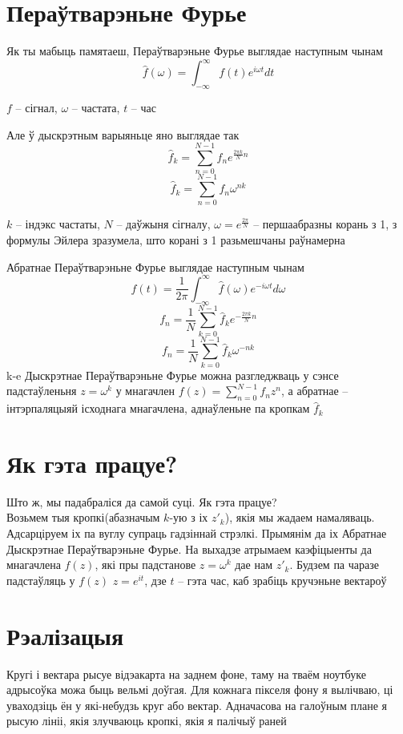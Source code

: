 \documentclass{article}
\newcommand{\rl}{\hspace*{5mm}}
\begin{document}
\section{Пераўтварэньне Фурье}
\rl Як ты мабыць памятаеш, Пераўтварэньне Фурье выглядае наступным чынам
\[ \hat{f}(\omega) = \int_{-\infty}^{\infty}{f(t)e^{i\omega t}dt} \]
\begin{center}
    \scriptsize $f$ \--- сігнал, $\omega$ \--- частата, $t$ \--- час
\end{center}
\rl Але ў дыскрэтным варыяньце яно выглядае так
\[ \hat{f}_k = \sum_{n = 0}^{N - 1}{f_n e^{\frac{2\pi k}{N}n}} \]
\[ \hat{f}_k = \sum_{n = 0}^{N - 1}{f_n \omega^{nk}} \]
\begin{center}
    \scriptsize $k$ \--- індэкс частаты, $N$ \--- даўжыня сігналу, $\omega = e^{\frac{2\pi}{N}}$ \--- першаабразны корань з 1, з формулы Эйлера зразумела,
    што корані з 1 разьмешчаны раўнамерна
\end{center}
\rl Абратнае Пераўтварэньне Фурье выглядае наступным чынам
\[ f(t) = \frac{1}{2\pi} \int_{-\infty}^{\infty}{\hat{f}(\omega)e^{-i\omega t} d\omega} \]
\[ f_n = \frac{1}{N} \sum_{k = 0}^{N - 1}{\hat{f}_k e^{-\frac{2\pi k}{N} n}} \]
\[ f_n = \frac{1}{N} \sum_{k = 0}^{N - 1}{\hat{f}_k \omega^{-nk}}\]
\rl k-e Дыскрэтнае Пераўтварэньне Фурье можна разгледжваць у сэнсе падстаўленьня $z = \omega^k$ у мнагачлен $f(z) = \sum_{n = 0}^{N - 1}{f_n z^n}$, а абратнае \--- інтэрпаляцыяй ісходнага мнагачлена,
аднаўленьне па кропкам $\hat{f}_k$
\section{Як гэта працуе?}
\rl Што ж, мы падабраліся да самой суці. Як гэта працуе? \\
\rl Возьмем тыя кропкі(абазначым $k$-ую з іх $z'_k$), якія мы жадаем намаляваць. Адсарціруем іх па вуглу супраць гадзіннай стрэлкі. Прымянім да іх Абратнае Дыскрэтнае Пераўтварэньне Фурье. 
На выхадзе атрымаем каэфіцыенты да мнагачлена $f(z)$, які пры падстанове $z = \omega^k$ дае нам $z'_k$. Будзем па чаразе падстаўляць у $f(z)$ $z = e^{it}$, дзе $t$ \--- гэта час, каб зрабіць кручэньне вектароў
\section{Рэалізацыя}
\rl Кругі і вектара рысуе відэакарта на заднем фоне, таму на тваём ноутбуке адрысоўка можа быць вельмі доўгая. Для кожнага пікселя фону я вылічваю, ці уваходзіць ён у які-небудзь круг або вектар.
Адначасова на галоўным плане я рысую лініі, якія злучваюць кропкі, якія я палічыў раней
\end{document}
